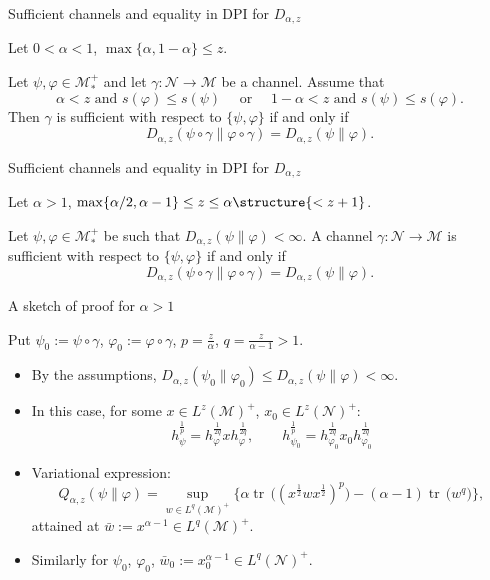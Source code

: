 \documentclass[mathserif]{beamer}
\newcommand{\<}{\langle}
\renewcommand{\>}{\rangle}
\newcommand{\Tr}{\operatorname{tr}\,}
\newcommand{\Me}{\mathcal M}
\newcommand{\Ne}{\mathcal N}
\begin{document}
\begin{frame}{Sufficient channels and equality in DPI for $D_{\alpha,z}$}
\begin{mybox}[title=Theorem]
Let $0<\alpha<1$, $\max\{\alpha,1-\alpha\}\le z$.

\bigskip

 Let $\psi,\varphi\in \Me_*^+$ and let $\gamma:\Ne\to\Me$ be a channel. Assume that
 \[
\alpha<z\text{ and } s(\varphi)\le s(\psi)\quad\text{ or }\quad 1-\alpha<z\text{ and }
s(\psi)\le s(\varphi).
 \]
Then $\gamma$ is sufficient with respect to $\{\psi,\varphi\}$ if and only if 
\[
D_{\alpha,z}(\psi\circ\gamma\|\varphi\circ\gamma)=D_{\alpha,z}(\psi\|\varphi).
\]

\end{mybox}

\end{frame}

\begin{frame}{Sufficient channels and equality in DPI for $D_{\alpha,z}$}

\begin{mybox}[title=Theorem]

Let $\alpha>1$, $\max\{\alpha/2,\alpha-1\}\le z\le \alpha\structure{<z+1}$.

\bigskip

Let $\psi,\varphi\in \Me_*^+$ be such that $D_{\alpha,z}(\psi\|\varphi)<\infty$. A channel
$\gamma: \Ne\to \Me$ is sufficient with respect to $\{\psi,\varphi\}$ if and only if
\[
D_{\alpha,z}(\psi\circ\gamma\|\varphi\circ\gamma)=D_{\alpha,z}(\psi\|\varphi).
\]
\end{mybox}

\end{frame}


\begin{frame}{A sketch of proof for $\alpha>1$}

Put $\psi_0:=\psi\circ\gamma$, $\varphi_0:=\varphi\circ\gamma$, $p=\frac{z}{\alpha}$,
$q=\frac{z}{\alpha-1}>1$.
\medskip

\begin{itemize}
\item By the assumptions, $D_{\alpha,z}(\psi_0\|\varphi_0)\le
D_{\alpha,z}(\psi\|\varphi)<\infty$.
\item In this case, for some $x\in L^{z}(\Me)^+$, $x_0\in L^{z}(\Ne)^+$: 
\[
h_\psi^{\frac1{p}}=h_\varphi^{\frac1{2q}}xh_\varphi^{\frac1{2q}},\qquad
h_{\psi_0}^{\frac1{p}}=h_{\varphi_0}^{\frac1{2q}}x_0h_{\varphi_0}^{\frac1{2q}}
\]
\item Variational expression:
\[
Q_{\alpha,z}(\psi\|\varphi)=\sup_{w\in
L^q(\Me)^+}\bigl\{\alpha\Tr\bigl((x^{\frac12}wx^{\frac12})^p\bigr)-(\alpha-1)\Tr\bigl(w^q\bigr)\bigr\},
\]
  attained at $\bar w:=x^{\alpha-1}\in L^q(\Me)^+$.
\medskip 

\item Similarly for $\psi_0$, $\varphi_0$, $\bar w_0:=x_0^{\alpha-1}\in
L^q(\Ne)^+$.
\end{itemize}


\end{frame}
\end{document}
